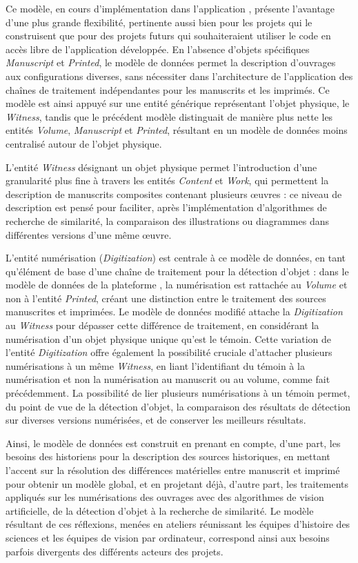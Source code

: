     Ce modèle, en cours d'implémentation dans l'application \eida, présente l'avantage d'une plus grande flexibilité, pertinente aussi bien pour les projets qui le construisent que pour des projets futurs qui souhaiteraient utiliser le code en accès libre de l'application développée. En l'absence d'objets spécifiques \textit{Manuscript} et \textit{Printed}, le modèle de données permet la description d'ouvrages aux configurations diverses, sans nécessiter dans l'architecture de l'application des chaînes de traitement indépendantes pour les manuscrits et les imprimés. Ce modèle est ainsi appuyé sur une entité générique représentant l’objet physique, le \textit{Witness}, tandis que le précédent modèle distinguait de manière plus nette les entités \textit{Volume}, \textit{Manuscript} et \textit{Printed}, résultant en un modèle de données moins centralisé autour de l'objet physique.
    
    L'entité \textit{Witness} désignant un objet physique permet l'introduction d'une granularité plus fine à travers les entités \textit{Content} et \textit{Work}, qui permettent la description de manuscrits composites contenant plusieurs œuvres : ce niveau de description est pensé pour faciliter, après l'implémentation d'algorithmes de recherche de similarité, la comparaison des illustrations ou diagrammes dans différentes versions d'une même œuvre.
    
    L'entité numérisation (\textit{Digitization}) est centrale à ce modèle de données, en tant qu'élément de base d'une chaîne de traitement pour la détection d'objet : dans le modèle de données de la plateforme \vhs, la numérisation est rattachée au \textit{Volume} et non à l'entité \textit{Printed}, créant une distinction entre le traitement des sources manuscrites et imprimées. Le modèle de données modifié attache la \textit{Digitization} au \textit{Witness} pour dépasser cette différence de traitement, en considérant la numérisation d'un objet physique unique qu'est le témoin. Cette variation de l'entité \textit{Digitization} offre également la possibilité cruciale d'attacher plusieurs numérisations à un même \textit{Witness}, en liant l'identifiant du témoin à la numérisation et non la numérisation au manuscrit ou au volume, comme fait précédemment. La possibilité de lier plusieurs numérisations à un témoin permet, du point de vue de la détection d'objet, la comparaison des résultats de détection sur diverses versions numérisées, et de conserver les meilleurs résultats.
    
    Ainsi, le modèle de données est construit en prenant en compte, d'une part, les besoins des historiens pour la description des sources historiques, en mettant l'accent sur la résolution des différences matérielles entre manuscrit et imprimé pour obtenir un modèle global, et en projetant déjà, d'autre part, les traitements appliqués sur les numérisations des ouvrages avec des algorithmes de vision artificielle, de la détection d'objet à la recherche de similarité. Le modèle résultant de ces réflexions, menées en ateliers réunissant les équipes d'histoire des sciences et les équipes de vision par ordinateur, correspond ainsi aux besoins parfois divergents des différents acteurs des projets.

